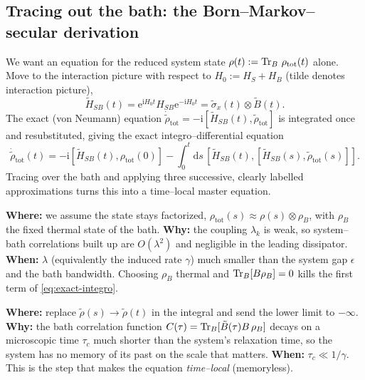 \documentclass[11pt,a4paper]{article}
\newcommand{\ee}{\mathrm{e}}
\newcommand{\ii}{\mathrm{i}}
\renewcommand{\dd}{\mathrm{d}}
\theoremstyle{definition}
\theoremstyle{remark}
\begin{document}
\subsection{Tracing out the bath: the Born--Markov--secular derivation}
\label{sec:BMS}
We want an equation for the reduced system state
$\rho(t) := \Tr_B\,\rho_{\mathrm{tot}}(t)$ alone. Move to the interaction
picture with respect to $H_0 := H_S+H_B$ (tilde denotes interaction
picture),
\begin{equation}
\tilde H_{SB}(t) = \ee^{\ii H_0 t} H_{SB} \ee^{-\ii H_0 t}
= \tilde\sigma_x(t)\otimes \tilde B(t).
\end{equation}
The exact (von Neumann) equation
$\dot{\tilde\rho}_{\mathrm{tot}}=-\ii[\tilde H_{SB}(t),
\tilde\rho_{\mathrm{tot}}]$ is integrated once and resubstituted, giving
the exact integro--differential equation
\begin{equation}
\dot{\tilde\rho}_{\mathrm{tot}}(t)
= -\ii[\tilde H_{SB}(t),\rho_{\mathrm{tot}}(0)]
  - \int_0^t \dd s\,
  [\tilde H_{SB}(t),[\tilde H_{SB}(s),\tilde\rho_{\mathrm{tot}}(s)]].
\label{eq:exact-integro}
\end{equation}
Tracing over the bath and applying three successive, clearly labelled
approximations turns this into a time--local master equation.

\begin{approxbox}
\textbf{Where:} we assume the state stays factorized,
$\rho_{\mathrm{tot}}(s)\approx \rho(s)\otimes\rho_B$, with $\rho_B$ the
fixed thermal state of the bath. \textbf{Why:} the coupling
$\lambda_k$ is weak, so system--bath correlations built up are
$O(\lambda^2)$ and negligible in the leading dissipator. \textbf{When:}
$\lambda$ (equivalently the induced rate $\gamma$) much smaller than the
system gap $\epsilon$ and the bath bandwidth. Choosing $\rho_B$ thermal
and $\Tr_B[B\rho_B]=0$ kills the first term of
\eqref{eq:exact-integro}.
\end{approxbox}

\begin{approxbox}
\textbf{Where:} replace $\tilde\rho(s)\to\tilde\rho(t)$ in the integral
and send the lower limit to $-\infty$. \textbf{Why:} the bath
correlation function
$C(\tau)=\Tr_B[\tilde B(\tau)B\,\rho_B]$ decays on a microscopic time
$\tau_c$ much shorter than the system's relaxation time, so the system
has no memory of its past on the scale that matters. \textbf{When:}
$\tau_c \ll 1/\gamma$. This is the step that makes the equation
\emph{time--local} (memoryless).
\end{approxbox}
\end{document}
